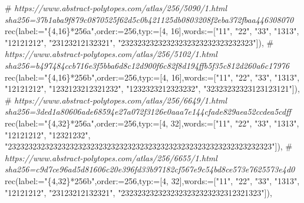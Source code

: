 \documentclass[
  10pt,
  letterpaper,
]{article}
\newenvironment{Shaded}{}{}
\newcommand{\CommentTok}[1]{\textcolor[rgb]{0.38,0.63,0.69}{\textit{#1}}}
\newcommand{\ExtensionTok}[1]{#1}
\newcommand{\FloatTok}[1]{\textcolor[rgb]{0.25,0.63,0.44}{#1}}
\newcommand{\NormalTok}[1]{#1}
\newcommand{\OperatorTok}[1]{\textcolor[rgb]{0.40,0.40,0.40}{#1}}
\newcommand{\StringTok}[1]{\textcolor[rgb]{0.25,0.44,0.63}{#1}}
\newcommand{\VariableTok}[1]{\textcolor[rgb]{0.10,0.09,0.49}{#1}}
\begin{document}
\begin{Shaded}
\begin{Highlighting}[]
\NormalTok{\#}\CommentTok{ https://www.abstract{-}polytopes.com/atlas/256/5090/1.html sha256=37b1aba9f879c0870525f62d5c0b421125db0803208f2eba372fbaa446308070}
\ExtensionTok{rec}\NormalTok{(}\VariableTok{label}\OperatorTok{:=}\StringTok{"\{4,16\}*256a"}\OperatorTok{,}\VariableTok{order}\OperatorTok{:=}\FloatTok{256}\OperatorTok{,}\VariableTok{typ}\OperatorTok{:=}\NormalTok{[}\FloatTok{4}\OperatorTok{,} \FloatTok{16}\NormalTok{]}\OperatorTok{,}\VariableTok{words}\OperatorTok{:=}\NormalTok{[}\StringTok{"11"}\OperatorTok{,} \StringTok{"22"}\OperatorTok{,} \StringTok{"33"}\OperatorTok{,} \StringTok{"1313"}\OperatorTok{,} \StringTok{"12121212"}\OperatorTok{,} \StringTok{"23123212132321"}\OperatorTok{,} \StringTok{"23232323232323232323232323232323"}\NormalTok{])}\OperatorTok{,}
\NormalTok{\#}\CommentTok{ https://www.abstract{-}polytopes.com/atlas/256/5102/1.html sha256=b497484ccb716e3f5bba6d8c12d900f6c82f8d194ffb5f35c812d260a6c17976}
\ExtensionTok{rec}\NormalTok{(}\VariableTok{label}\OperatorTok{:=}\StringTok{"\{4,16\}*256b"}\OperatorTok{,}\VariableTok{order}\OperatorTok{:=}\FloatTok{256}\OperatorTok{,}\VariableTok{typ}\OperatorTok{:=}\NormalTok{[}\FloatTok{4}\OperatorTok{,} \FloatTok{16}\NormalTok{]}\OperatorTok{,}\VariableTok{words}\OperatorTok{:=}\NormalTok{[}\StringTok{"11"}\OperatorTok{,} \StringTok{"22"}\OperatorTok{,} \StringTok{"33"}\OperatorTok{,} \StringTok{"1313"}\OperatorTok{,} \StringTok{"12121212"}\OperatorTok{,} \StringTok{"1232123212321232"}\OperatorTok{,} \StringTok{"1232323212323232"}\OperatorTok{,} \StringTok{"32323232323123123121"}\NormalTok{])}\OperatorTok{,}
\NormalTok{\#}\CommentTok{ https://www.abstract{-}polytopes.com/atlas/256/6649/1.html sha256=3ded1a80606ade68594e27a072f3126e0aaa7e144cfade829aea52ccdea5cdff}
\ExtensionTok{rec}\NormalTok{(}\VariableTok{label}\OperatorTok{:=}\StringTok{"\{4,32\}*256a"}\OperatorTok{,}\VariableTok{order}\OperatorTok{:=}\FloatTok{256}\OperatorTok{,}\VariableTok{typ}\OperatorTok{:=}\NormalTok{[}\FloatTok{4}\OperatorTok{,} \FloatTok{32}\NormalTok{]}\OperatorTok{,}\VariableTok{words}\OperatorTok{:=}\NormalTok{[}\StringTok{"11"}\OperatorTok{,} \StringTok{"22"}\OperatorTok{,} \StringTok{"33"}\OperatorTok{,} \StringTok{"1313"}\OperatorTok{,} \StringTok{"12121212"}\OperatorTok{,} \StringTok{"12321232"}\OperatorTok{,} \StringTok{"2323232323232323232323232323232323232323232323232323232323232323"}\NormalTok{])}\OperatorTok{,}
\NormalTok{\#}\CommentTok{ https://www.abstract{-}polytopes.com/atlas/256/6655/1.html sha256=c9d7ce96ad5d81606c20e396fd33b97182cf567e9c54bd8ce573e7625573e4d0}
\ExtensionTok{rec}\NormalTok{(}\VariableTok{label}\OperatorTok{:=}\StringTok{"\{4,32\}*256b"}\OperatorTok{,}\VariableTok{order}\OperatorTok{:=}\FloatTok{256}\OperatorTok{,}\VariableTok{typ}\OperatorTok{:=}\NormalTok{[}\FloatTok{4}\OperatorTok{,} \FloatTok{32}\NormalTok{]}\OperatorTok{,}\VariableTok{words}\OperatorTok{:=}\NormalTok{[}\StringTok{"11"}\OperatorTok{,} \StringTok{"22"}\OperatorTok{,} \StringTok{"33"}\OperatorTok{,} \StringTok{"1313"}\OperatorTok{,} \StringTok{"12121212"}\OperatorTok{,} \StringTok{"23123212132321"}\OperatorTok{,} \StringTok{"2323232323232323232323232312321323"}\NormalTok{])}\OperatorTok{,}

\end{Highlighting}
\end{Shaded}
\end{document}
